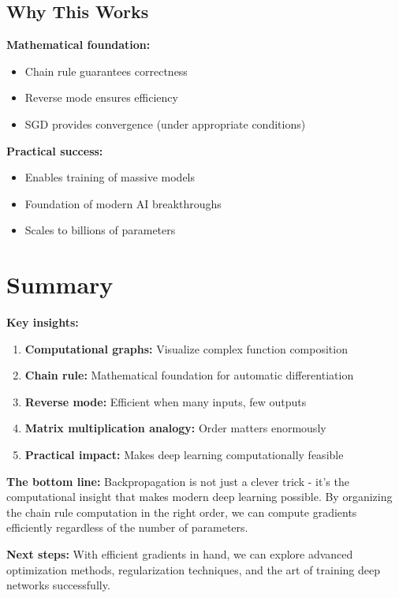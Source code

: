 \documentclass[11pt]{article}
\begin{document}
\subsection{Why This Works}
\textbf{Mathematical foundation:}
\begin{itemize}
\item Chain rule guarantees correctness
\item Reverse mode ensures efficiency
\item SGD provides convergence (under appropriate conditions)
\end{itemize}

\textbf{Practical success:}
\begin{itemize}
\item Enables training of massive models
\item Foundation of modern AI breakthroughs
\item Scales to billions of parameters
\end{itemize}

\section{Summary}

\textbf{Key insights:}
\begin{enumerate}
\item \textbf{Computational graphs:} Visualize complex function composition
\item \textbf{Chain rule:} Mathematical foundation for automatic differentiation
\item \textbf{Reverse mode:} Efficient when many inputs, few outputs
\item \textbf{Matrix multiplication analogy:} Order matters enormously
\item \textbf{Practical impact:} Makes deep learning computationally feasible
\end{enumerate}

\textbf{The bottom line:} Backpropagation is not just a clever trick - it's the computational insight that makes modern deep learning possible. By organizing the chain rule computation in the right order, we can compute gradients efficiently regardless of the number of parameters.

\textbf{Next steps:} With efficient gradients in hand, we can explore advanced optimization methods, regularization techniques, and the art of training deep networks successfully.
\end{document}
